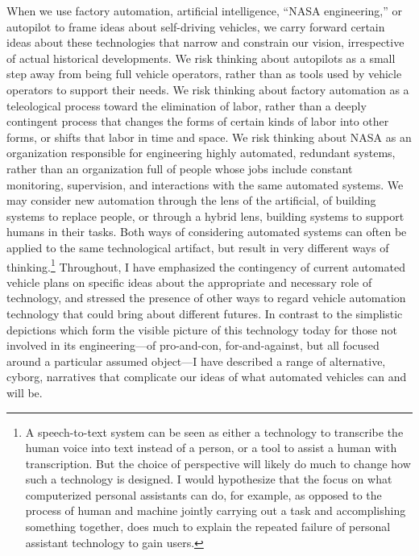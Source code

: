 When we use factory automation, artificial intelligence, ``NASA
engineering,'' or autopilot to frame ideas about self-driving
vehicles, we carry forward certain ideas about these technologies that
narrow and constrain our vision, irrespective of actual historical
developments. We risk 
thinking about autopilots as a small step away from being full vehicle
operators, rather than as tools used by vehicle operators to support
their needs. We risk thinking about factory automation as a
teleological process toward the elimination of labor, rather than a
deeply contingent process that changes the forms of certain kinds of
labor into other forms, or shifts that labor in time and space. We
risk thinking about NASA as an organization responsible for
engineering highly automated, redundant systems, rather than an
organization full of people whose jobs include constant monitoring,
supervision, and interactions with the same automated systems. We may
consider new automation through the lens of the artificial, of
building systems to replace people, or through a hybrid lens, building
systems to support humans in their tasks. Both ways of considering
automated systems can often be applied to the same technological
artifact, but result in very different ways of thinking.\footnote{A
speech-to-text system can be seen as either a technology to transcribe 
the human voice into text instead of a person, or a tool to assist a
human with transcription. But the choice of perspective will likely do
much to change how such a technology is designed. I would hypothesize that
the focus on what computerized personal assistants can do, for
example, as opposed to the process of human and machine jointly
carrying out a task and accomplishing something together, does much to
explain the repeated failure of personal assistant technology to gain
users.}  Throughout, I have emphasized the contingency of current
automated vehicle plans on specific ideas about the appropriate and
necessary role of technology, and stressed the presence of other ways
to regard vehicle automation technology that could bring about
different futures. In contrast to the simplistic depictions which form
the visible picture of this technology today 
for those not involved in its engineering---of pro-and-con, for-and-against, but all
focused around a particular assumed object---I have described a
range of alternative, cyborg, narratives that complicate our ideas of what
automated vehicles can and will be.

